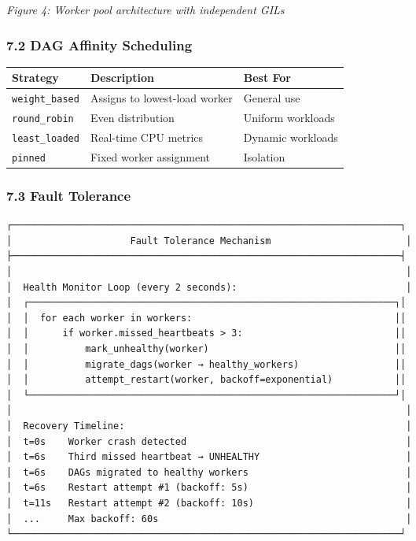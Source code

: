 \documentclass[
]{article}
\begin{document}
\emph{Figure 4: Worker pool architecture with independent GILs}

\hypertarget{dag-affinity-scheduling}{%
\subsubsection{7.2 DAG Affinity
Scheduling}\label{dag-affinity-scheduling}}

\begin{longtable}[]{@{}lll@{}}
\toprule\noalign{}
Strategy & Description & Best For \\
\midrule\noalign{}
\endhead
\bottomrule\noalign{}
\endlastfoot
\texttt{weight\_based} & Assigns to lowest-load worker & General use \\
\texttt{round\_robin} & Even distribution & Uniform workloads \\
\texttt{least\_loaded} & Real-time CPU metrics & Dynamic workloads \\
\texttt{pinned} & Fixed worker assignment & Isolation \\
\end{longtable}

\hypertarget{fault-tolerance}{%
\subsubsection{7.3 Fault Tolerance}\label{fault-tolerance}}

\begin{verbatim}
┌─────────────────────────────────────────────────────────────────────┐
│                     Fault Tolerance Mechanism                        │
├─────────────────────────────────────────────────────────────────────┤
│                                                                      │
│  Health Monitor Loop (every 2 seconds):                              │
│  ┌─────────────────────────────────────────────────────────────────┐│
│  │  for each worker in workers:                                    ││
│  │      if worker.missed_heartbeats > 3:                           ││
│  │          mark_unhealthy(worker)                                 ││
│  │          migrate_dags(worker → healthy_workers)                 ││
│  │          attempt_restart(worker, backoff=exponential)           ││
│  └─────────────────────────────────────────────────────────────────┘│
│                                                                      │
│  Recovery Timeline:                                                  │
│  t=0s    Worker crash detected                                       │
│  t=6s    Third missed heartbeat → UNHEALTHY                          │
│  t=6s    DAGs migrated to healthy workers                            │
│  t=6s    Restart attempt #1 (backoff: 5s)                            │
│  t=11s   Restart attempt #2 (backoff: 10s)                           │
│  ...     Max backoff: 60s                                            │
└─────────────────────────────────────────────────────────────────────┘
\end{verbatim}
\end{document}
